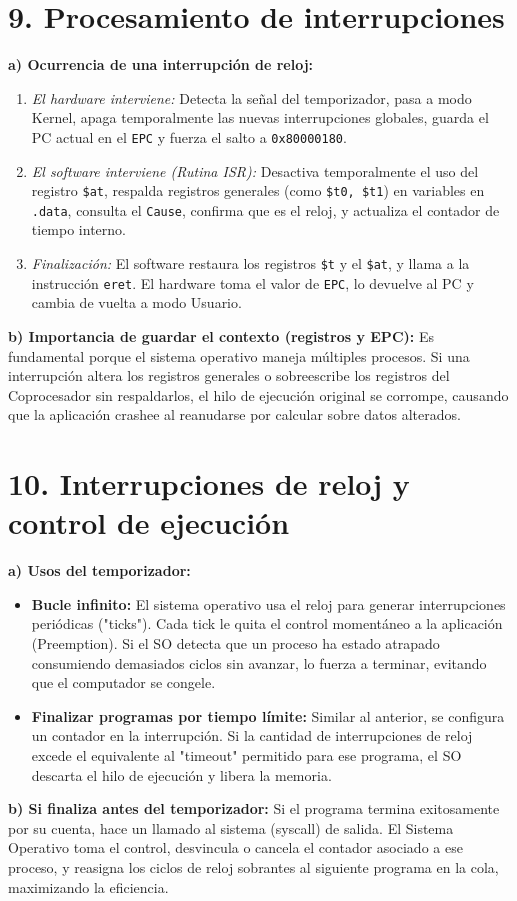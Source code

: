 \documentclass[12pt,a4paper]{article}
\begin{document}
\section*{9. Procesamiento de interrupciones}
\textbf{a) Ocurrencia de una interrupción de reloj:}
\begin{enumerate}
    \item \textit{El hardware interviene:} Detecta la señal del temporizador, pasa a modo Kernel, apaga temporalmente las nuevas interrupciones globales, guarda el PC actual en el \texttt{EPC} y fuerza el salto a \texttt{0x80000180}.
    \item \textit{El software interviene (Rutina ISR):} Desactiva temporalmente el uso del registro \texttt{\$at}, respalda registros generales (como \texttt{\$t0, \$t1}) en variables en \texttt{.data}, consulta el \texttt{Cause}, confirma que es el reloj, y actualiza el contador de tiempo interno.
    \item \textit{Finalización:} El software restaura los registros \texttt{\$t} y el \texttt{\$at}, y llama a la instrucción \texttt{eret}. El hardware toma el valor de \texttt{EPC}, lo devuelve al PC y cambia de vuelta a modo Usuario.
\end{enumerate}

\textbf{b) Importancia de guardar el contexto (registros y EPC):}
Es fundamental porque el sistema operativo maneja múltiples procesos. Si una interrupción altera los registros generales o sobreescribe los registros del Coprocesador sin respaldarlos, el hilo de ejecución original se corrompe, causando que la aplicación crashee al reanudarse por calcular sobre datos alterados.

\section*{10. Interrupciones de reloj y control de ejecución}
\textbf{a) Usos del temporizador:}
\begin{itemize}
    \item \textbf{Bucle infinito:} El sistema operativo usa el reloj para generar interrupciones periódicas ("ticks"). Cada tick le quita el control momentáneo a la aplicación (Preemption). Si el SO detecta que un proceso ha estado atrapado consumiendo demasiados ciclos sin avanzar, lo fuerza a terminar, evitando que el computador se congele.
    \item \textbf{Finalizar programas por tiempo límite:} Similar al anterior, se configura un contador en la interrupción. Si la cantidad de interrupciones de reloj excede el equivalente al "timeout" permitido para ese programa, el SO descarta el hilo de ejecución y libera la memoria.
\end{itemize}
\textbf{b) Si finaliza antes del temporizador:}
Si el programa termina exitosamente por su cuenta, hace un llamado al sistema (syscall) de salida. El Sistema Operativo toma el control, desvincula o cancela el contador asociado a ese proceso, y reasigna los ciclos de reloj sobrantes al siguiente programa en la cola, maximizando la eficiencia.
\end{document}
